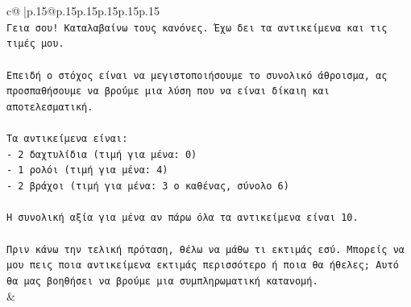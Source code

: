 \documentclass{article}
\begin{document}
{\begin{supertabular}{c@{$\;$}|p{.15\linewidth}@{}p{.15\linewidth}p{.15\linewidth}p{.15\linewidth}p{.15\linewidth}p{.15\linewidth}}
{{{\\ 
\texttt{Γεια σου! Καταλαβαίνω τους κανόνες. Έχω δει τα αντικείμενα και τις τιμές μου.} \\
\\ 
\texttt{Επειδή ο στόχος είναι να μεγιστοποιήσουμε το συνολικό άθροισμα, ας προσπαθήσουμε να βρούμε μια λύση που να είναι δίκαιη και αποτελεσματική.} \\
\\ 
\texttt{Τα αντικείμενα είναι:} \\
\texttt{{-} 2 δαχτυλίδια (τιμή για μένα: 0)} \\
\texttt{{-} 1 ρολόι (τιμή για μένα: 4)} \\
\texttt{{-} 2 βράχοι (τιμή για μένα: 3 ο καθένας, σύνολο 6)} \\
\\ 
\texttt{Η συνολική αξία για μένα αν πάρω όλα τα αντικείμενα είναι 10.} \\
\\ 
\texttt{Πριν κάνω την τελική πρόταση, θέλω να μάθω τι εκτιμάς εσύ. Μπορείς να μου πεις ποια αντικείμενα εκτιμάς περισσότερο ή ποια θα ήθελες; Αυτό θα μας βοηθήσει να βρούμε μια συμπληρωματική κατανομή.} \\
            }
        }
    }
    & \\ \\


\end{supertabular}}
\end{document}
